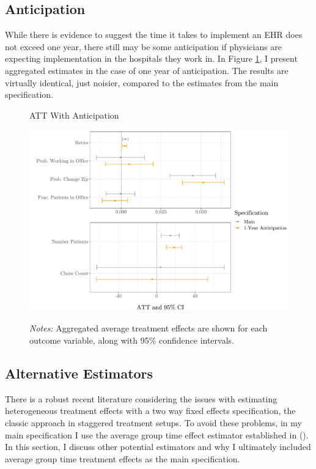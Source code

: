 \documentclass[12pt]{article}
\begin{document}
\subsection{Anticipation}\label{app:anticipation}

While there is evidence to suggest the time it takes to implement an EHR does not exceed one year, there still may be some anticipation if physicians are expecting implementation in the hospitals they work in. In Figure \ref{fig:anticipation}, I present aggregated estimates in the case of one year of anticipation. The results are virtually identical, just noisier, compared to the estimates from the main specification. 

\begin{figure}[ht]
    \centering
    \captionsetup{width=.57\linewidth}
    \caption{ATT With Anticipation}
    \includegraphics[scale=.57]{Objects/anticipation_graph.pdf}
    \label{fig:anticipation}
    \vspace{2mm}
    \caption*{\footnotesize{\textit{Notes:} Aggregated average treatment effects are shown for each outcome variable, along with 95\% confidence intervals.}}
\end{figure}

\subsection{Alternative Estimators}\label{app:estimators}

There is a robust recent literature considering the issues with estimating heterogeneous treatment effects with a two way fixed effects specification, the classic approach in staggered treatment setups. To avoid these problems, in my main specification I use the average group time effect estimator established in \citeauthor{callaway2021difference} (\citeyear{callaway2021difference}). In this section, I discuss other potential estimators and why I ultimately included average group time treatment effects as the main specification. 
\end{document}
